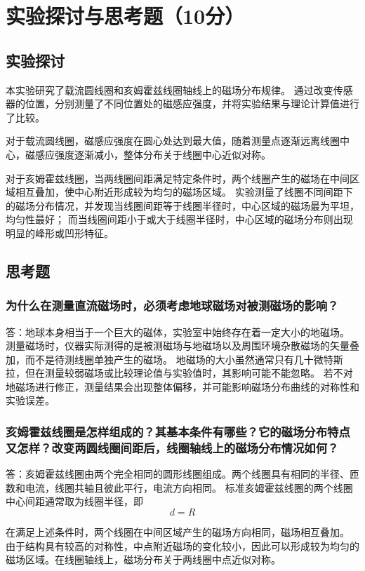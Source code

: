 \documentclass[10pt,a4paper]{ctexart} %
\begin{document}
\section{实验探讨与思考题（10分）}

  \subsection{实验探讨}
  本实验研究了载流圆线圈和亥姆霍兹线圈轴线上的磁场分布规律。
  通过改变传感器的位置，分别测量了不同位置处的磁感应强度，并将实验结果与理论计算值进行了比较。

  对于载流圆线圈，磁感应强度在圆心处达到最大值，随着测量点逐渐远离线圈中心，磁感应强度逐渐减小，整体分布关于线圈中心近似对称。

  对于亥姆霍兹线圈，当两线圈间距满足特定条件时，两个线圈产生的磁场在中间区域相互叠加，使中心附近形成较为均匀的磁场区域。
  实验测量了线圈不同间距下的磁场分布情况，并发现当线圈间距等于线圈半径时，中心区域的磁场最为平坦，均匀性最好；
  而当线圈间距小于或大于线圈半径时，中心区域的磁场分布则出现明显的峰形或凹形特征。

  \subsection{思考题}

    \subsubsection{为什么在测量直流磁场时，必须考虑地球磁场对被测磁场的影响？}
    答：地球本身相当于一个巨大的磁体，实验室中始终存在着一定大小的地磁场。
    测量磁场时，仪器实际测得的是被测磁场与地磁场以及周围环境杂散磁场的矢量叠加，而不是待测线圈单独产生的磁场。
    地磁场的大小虽然通常只有几十微特斯拉，但在测量较弱磁场或比较理论值与实验值时，其影响可能不能忽略。
    若不对地磁场进行修正，测量结果会出现整体偏移，并可能影响磁场分布曲线的对称性和实验误差。

    \subsubsection{亥姆霍兹线圈是怎样组成的？其基本条件有哪些？它的磁场分布特点又怎样？改变两圆线圈间距后，线圈轴线上的磁场分布情况如何？}
    答：亥姆霍兹线圈由两个完全相同的圆形线圈组成。两个线圈具有相同的半径、匝数和电流，线圈共轴且彼此平行，电流方向相同。
    标准亥姆霍兹线圈的两个线圈中心间距通常取为线圈半径，即
    \[
    d=R
    \]

    在满足上述条件时，两个线圈在中间区域产生的磁场方向相同，磁场相互叠加。
    由于结构具有较高的对称性，中点附近磁场的变化较小，因此可以形成较为均匀的磁场区域。在线圈轴线上，磁场分布关于两线圈中点近似对称。
\end{document}
